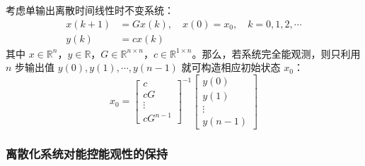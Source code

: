 \begin{theorem}[最小拍观测]
    考虑单输出离散时间线性时不变系统：
    \begin{align*}
        x(k+1) &= Gx(k), \quad x(0) = x_0, \quad k = 0, 1, 2, \cdots \\
        y(k) &= cx(k)
    \end{align*}
    其中 $x \in \mathbb{R}^n$，$y \in \mathbb{R}$，$G \in \mathbb{R}^{n \times n}$，$c \in \mathbb{R}^{1 \times n}$。那么，若系统完全能观测，则只利用 $n$ 步输出值 $y(0), y(1), \cdots, y(n-1)$ 就可构造相应初始状态 $x_0$：
    \begin{equation*}
        x_0 =
        \begin{bmatrix}
        c \\ cG \\ \vdots \\ cG^{n-1}
        \end{bmatrix}^{-1}
        \begin{bmatrix}
        y(0) \\ y(1) \\ \vdots \\ y(n-1)
        \end{bmatrix}
    \end{equation*}
\end{theorem}

\subsubsection{离散化系统对能控能观性的保持}

